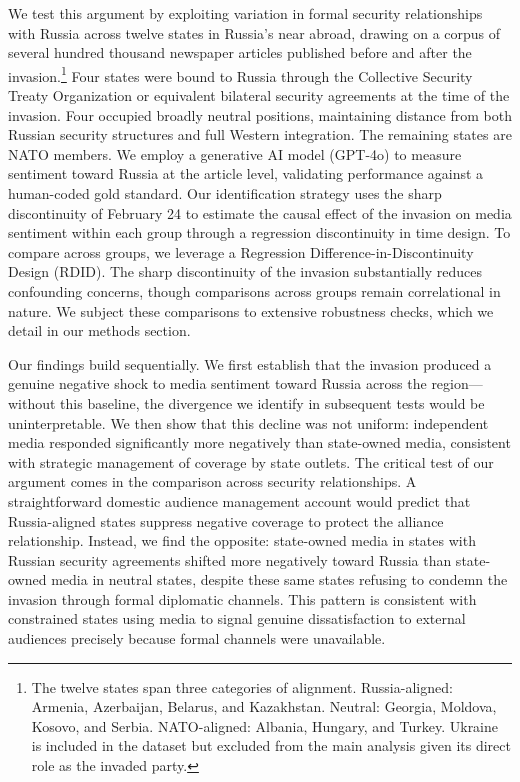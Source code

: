 \documentclass[12pt]{article}
\begin{document}
We test this argument by exploiting variation in formal security relationships with Russia across twelve states in Russia's near abroad, drawing on a corpus of several hundred thousand newspaper articles published before and after the invasion.\footnote{The twelve states span three categories of alignment. Russia-aligned: Armenia, Azerbaijan, Belarus, and Kazakhstan. Neutral: Georgia, Moldova, Kosovo, and Serbia. NATO-aligned: Albania, Hungary, and Turkey. Ukraine is included in the dataset but excluded from the main analysis given its direct role as the invaded party.} Four states were bound to Russia through the Collective Security Treaty Organization or equivalent bilateral security agreements at the time of the invasion. Four occupied broadly neutral positions, maintaining distance from both Russian security structures and full Western integration. The remaining states are NATO members. We employ a generative AI model (GPT-4o) to measure sentiment toward Russia at the article level, validating performance against a human-coded gold standard. Our identification strategy uses the sharp discontinuity of February 24 to estimate the causal effect of the invasion on media sentiment within each group through a regression discontinuity in time design. To compare across groups, we leverage a Regression Difference-in-Discontinuity Design (RDID). The sharp discontinuity of the invasion substantially reduces confounding concerns, though comparisons across groups remain correlational in nature. We subject these comparisons to extensive robustness checks, which we detail in our methods section.
 
Our findings build sequentially. We first establish that the invasion produced a genuine negative shock to media sentiment toward Russia across the region---without this baseline, the divergence we identify in subsequent tests would be uninterpretable. We then show that this decline was not uniform: independent media responded significantly more negatively than state-owned media, consistent with strategic management of coverage by state outlets. The critical test of our argument comes in the comparison across security relationships. A straightforward domestic audience management account would predict that Russia-aligned states suppress negative coverage to protect the alliance relationship. Instead, we find the opposite: state-owned media in states with Russian security agreements shifted more negatively toward Russia than state-owned media in neutral states, despite these same states refusing to condemn the invasion through formal diplomatic channels. This pattern is consistent with constrained states using media to signal genuine dissatisfaction to external audiences precisely because formal channels were unavailable.
 
\end{document}
